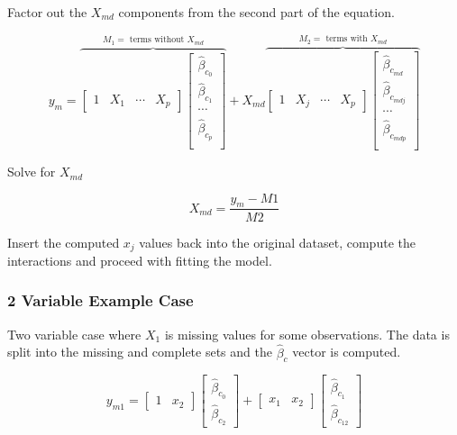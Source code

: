 \documentclass[../../paper.tex]{subfiles}
\begin{document}
Factor out the $X_{md}$ components from the second part of the equation.

\begin{equation}
  y_{m} =
  \overbrace{
  \begin{bmatrix}
    1 & X_{1} & \cdots & X_{p}
  \end{bmatrix}
  \begin{bmatrix}
    \hat{\beta}_{c_0} \\
    \hat{\beta}_{c_1} \\
    \cdots \\
    \hat{\beta}_{c_p} \\
  \end{bmatrix}}^{M_{1} = \text{ terms without } X_{md}} +
  X_{md}
  \overbrace{
  \begin{bmatrix}
    1 & X_{j} & \cdots & X_{p}
  \end{bmatrix}
  \begin{bmatrix}
    \hat{\beta}_{c_{md}} \\
    \hat{\beta}_{c_{mdj}} \\
    \cdots \\
    \hat{\beta}_{c_{mdp}} \\
  \end{bmatrix}}^{M_{2} = \text{ terms with } X_{md}}
\end{equation}

Solve for $X_{md}$

\begin{equation}
X_{md} = \frac{y_{m} - M1}{M2}
\end{equation}

Insert the computed $x_{j}$ values back into the original dataset, compute the interactions and proceed with fitting the model.

\subsubsection*{2 Variable Example Case}
Two variable case where $X_{1}$ is missing values for some observations. The data
is split into the missing and complete sets and the $\hat{\beta}_{c}$ vector is
computed.

\begin{equation}
  y_{m1} =
  \begin{bmatrix}
    1 & x_{2}
  \end{bmatrix}
  \begin{bmatrix}
    \hat{\beta}_{c_0} \\
    \hat{\beta}_{c_2}
  \end{bmatrix} +
  \begin{bmatrix}
    x_{1} & x_{2}
  \end{bmatrix}
  \begin{bmatrix}
    \hat{\beta}_{c_1} \\
    \hat{\beta}_{c_{12}}
  \end{bmatrix}
\end{equation}
\end{document}
